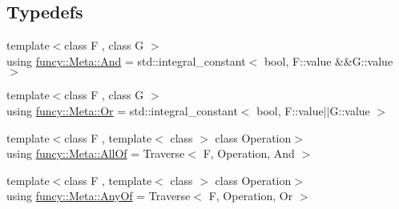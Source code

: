 \subsection*{Typedefs}
\begin{DoxyCompactItemize}
\item 
{\footnotesize template$<$class F , class G $>$ }\\using \hyperlink{namespacefuncy_1_1Meta_a41cc898590e15dae8d6da038f55f3cd2}{funcy\-::\-Meta\-::\-And} = std\-::integral\-\_\-constant$<$ bool, F\-::value \&\&G\-::value $>$
\item 
{\footnotesize template$<$class F , class G $>$ }\\using \hyperlink{namespacefuncy_1_1Meta_a7a832030d5229986a69d3518833e1b8f}{funcy\-::\-Meta\-::\-Or} = std\-::integral\-\_\-constant$<$ bool, F\-::value$\vert$$\vert$G\-::value $>$
\item 
{\footnotesize template$<$class F , template$<$ class $>$ class Operation$>$ }\\using \hyperlink{namespacefuncy_1_1Meta_a7957593ba11cc9c461684ee7efbeb3c4}{funcy\-::\-Meta\-::\-All\-Of} = Traverse$<$ F, Operation, And $>$
\item 
{\footnotesize template$<$class F , template$<$ class $>$ class Operation$>$ }\\using \hyperlink{namespacefuncy_1_1Meta_ad563ba73c1ea4946f6168ad527e02346}{funcy\-::\-Meta\-::\-Any\-Of} = Traverse$<$ F, Operation, Or $>$
\end{DoxyCompactItemize}
